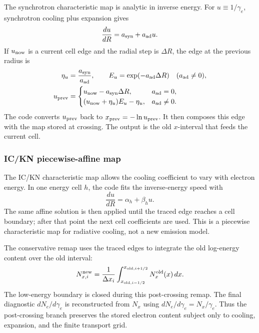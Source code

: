 \documentclass[twocolumn]{aastex702}
\begin{document}
The synchrotron characteristic map is analytic in inverse energy.  For
\(u\equiv1/\gamma_e\), synchrotron cooling plus expansion gives
\begin{equation}
\frac{du}{dR}=a_{\rm syn}+a_{\rm ad}u .
\end{equation}
If \(u_{\rm now}\) is a current cell edge and the radial step is \(\Delta R\),
the edge at the previous radius is
\begin{equation}
\begin{aligned}
\eta_u&=\frac{a_{\rm syn}}{a_{\rm ad}},\qquad
E_u=\exp(-a_{\rm ad}\Delta R)
\quad(a_{\rm ad}\ne0),\\
u_{\rm prev}&=
\begin{cases}
u_{\rm now}-a_{\rm syn}\Delta R, & a_{\rm ad}=0,\\
(u_{\rm now}+\eta_u)E_u-\eta_u, & a_{\rm ad}\ne0 .
\end{cases}
\end{aligned}
\end{equation}
The code converts \(u_{\rm prev}\) back to \(x_{\rm prev}=-\ln u_{\rm prev}\).
It then composes this edge with the map stored at crossing.  The output is the
old \(x\)-interval that feeds the current cell.

\subsubsection{IC/KN piecewise-affine map}

The IC/KN characteristic map allows the cooling coefficient to vary with electron
energy.  In one energy cell \(h\), the code fits the inverse-energy speed with
\begin{equation}
\frac{du}{dR}=\alpha_h+\beta_hu .
\end{equation}
The same affine solution is then applied until the traced edge reaches a cell
boundary; after that point the next cell coefficients are used.  This is a
piecewise characteristic map for radiative cooling, not a new emission model.

The conservative remap uses the traced edges to integrate the old log-energy
content over the old interval:
\begin{equation}
N_{x,i}^{\rm new}
=\frac{1}{\Delta x_i}
\int_{x_{{\rm old},i-1/2}}^{x_{{\rm old},i+1/2}}
N_x^{\rm old}(x)\,dx .
\end{equation}
The low-energy boundary is closed during this post-crossing remap.  The final
diagnostic \(dN_e/d\gamma_e\) is reconstructed from \(N_x\) using
\(dN_e/d\gamma_e=N_x/\gamma_e\).  Thus the post-crossing branch preserves the
stored electron content subject only to cooling, expansion, and the finite
transport grid.
\end{document}
